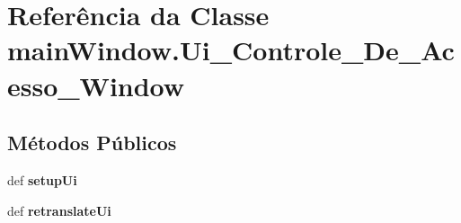 \hypertarget{classmainWindow_1_1Ui__Controle__De__Acesso__Window}{\section{\-Referência da \-Classe main\-Window.\-Ui\-\_\-\-Controle\-\_\-\-De\-\_\-\-Acesso\-\_\-\-Window}
\label{classmainWindow_1_1Ui__Controle__De__Acesso__Window}
}
\subsection*{\-Métodos \-Públicos}
\begin{DoxyCompactItemize}
\item 
\hypertarget{classmainWindow_1_1Ui__Controle__De__Acesso__Window_aae2772b99828a93000b8a04163f7b488}{def {\bfseries setup\-Ui}}\label{classmainWindow_1_1Ui__Controle__De__Acesso__Window_aae2772b99828a93000b8a04163f7b488}

\item 
\hypertarget{classmainWindow_1_1Ui__Controle__De__Acesso__Window_a5f73676bba8ab8da1dc19dc4e87fa6e1}{def {\bfseries retranslate\-Ui}}\label{classmainWindow_1_1Ui__Controle__De__Acesso__Window_a5f73676bba8ab8da1dc19dc4e87fa6e1}

\end{DoxyCompactItemize}

